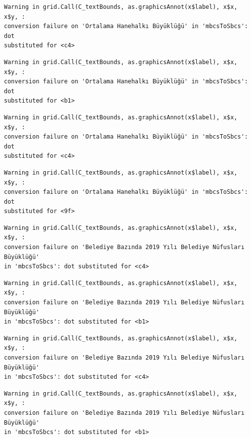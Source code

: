\documentclass[
  11pt,
  a4paper,
  DIV=11,
  numbers=noendperiod]{scrartcl}
\begin{document}
\begin{verbatim}
Warning in grid.Call(C_textBounds, as.graphicsAnnot(x$label), x$x, x$y, :
conversion failure on 'Ortalama Hanehalkı Büyüklüğü' in 'mbcsToSbcs': dot
substituted for <c4>
\end{verbatim}

\begin{verbatim}
Warning in grid.Call(C_textBounds, as.graphicsAnnot(x$label), x$x, x$y, :
conversion failure on 'Ortalama Hanehalkı Büyüklüğü' in 'mbcsToSbcs': dot
substituted for <b1>
\end{verbatim}

\begin{verbatim}
Warning in grid.Call(C_textBounds, as.graphicsAnnot(x$label), x$x, x$y, :
conversion failure on 'Ortalama Hanehalkı Büyüklüğü' in 'mbcsToSbcs': dot
substituted for <c4>
\end{verbatim}

\begin{verbatim}
Warning in grid.Call(C_textBounds, as.graphicsAnnot(x$label), x$x, x$y, :
conversion failure on 'Ortalama Hanehalkı Büyüklüğü' in 'mbcsToSbcs': dot
substituted for <9f>
\end{verbatim}

\begin{verbatim}
Warning in grid.Call(C_textBounds, as.graphicsAnnot(x$label), x$x, x$y, :
conversion failure on 'Belediye Bazında 2019 Yılı Belediye Nüfusları Büyüklüğü'
in 'mbcsToSbcs': dot substituted for <c4>
\end{verbatim}

\begin{verbatim}
Warning in grid.Call(C_textBounds, as.graphicsAnnot(x$label), x$x, x$y, :
conversion failure on 'Belediye Bazında 2019 Yılı Belediye Nüfusları Büyüklüğü'
in 'mbcsToSbcs': dot substituted for <b1>
\end{verbatim}

\begin{verbatim}
Warning in grid.Call(C_textBounds, as.graphicsAnnot(x$label), x$x, x$y, :
conversion failure on 'Belediye Bazında 2019 Yılı Belediye Nüfusları Büyüklüğü'
in 'mbcsToSbcs': dot substituted for <c4>
\end{verbatim}

\begin{verbatim}
Warning in grid.Call(C_textBounds, as.graphicsAnnot(x$label), x$x, x$y, :
conversion failure on 'Belediye Bazında 2019 Yılı Belediye Nüfusları Büyüklüğü'
in 'mbcsToSbcs': dot substituted for <b1>
\end{verbatim}
\end{document}
